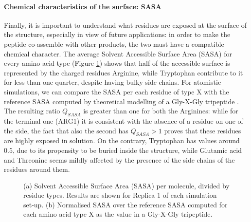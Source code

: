 \paragraph{Chemical characteristics of the surface: SASA} Finally, it is important to understand what residues are exposed at the surface of the structure, especially in view of future applications: in order to make the peptide co-assemble with other products, the two must have a compatible chemical character. The average Solvent Accessible Surface Area (SASA) for every amino acid type (Figure \ref{fig:BTI_sasa_exposed}) shows that half of the accessible surface is represented by the charged residues Arginine, while Tryptophan contribute to it for less than one quarter, despite having bulky side chains.
%
For atomistic simulations, we can compare the SASA per each residue of type X with the reference SASA computed by theoretical modelling of a Gly-X-Gly tripeptide \citep{Tien2013}. The resulting ratio $Q_{SASA}$ is greater than one for both the Arginines: while for the terminal one (ARG1) it is consistent with the absence of a residue on one of the side, the fact that also the second has $Q_{SASA}>1$ proves that these residues are highly exposed in solution. On the contrary, Tryptophan has values around $0.5$, due to its propensity to be buried inside the structure, while Glutamic acid and Threonine seems mildly affected by the presence of the side chains of the residues around them.
\begin{figure}[t]
\centering
{} 
\caption[SASA per residue of a buckyball in solution]{(a) Solvent Accessible Surface Area (SASA) per molecule, divided by residue types. Results are shown for Replica 1 of each simulation set-up. (b) Normalised SASA over the reference SASA computed for each amino acid type X as the value in a Gly-X-Gly tripeptide.}
\label{fig:BTI_sasa_exposed}
\end{figure}

